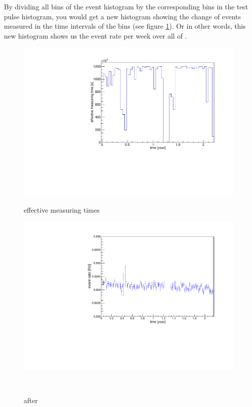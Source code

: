 By dividing all bins of the event histogram by the corresponding bins in the test pulse histogram, you would get a new histogram showing the change of events measured in the time intervals of the bins (see figure \ref{fig:ChangeInEventRate}).
Or in other words, this new histogram shows us the event rate per week over all of \PII.
\\
\begin{figure}[t!]
	\centering
	\begin{minipage}{.5\textwidth}
		\centering
		\includegraphics[width=\textwidth]{./Bilder/testpuler.pdf}
		\caption{effective measuring times}
		\label{fig:effectiveMeasuringTimes}
	\end{minipage}%
	\begin{minipage}{.5\textwidth}
		\centering
		\includegraphics[width=\textwidth]{./Bilder/eventRate.pdf}
		\caption{after}
		\label{fig:ChangeInEventRate}
	\end{minipage}
	\\
\end{figure}

